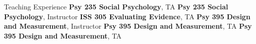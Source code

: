 \begin{rubric}{Teaching Experience}
\entry*[Fall 2019]\textbf{Psy 235 Social Psychology}, TA
\entry*[Summer 2019]\textbf{Psy 235 Social Psychology}, Instructor
\entry*[Fall 2018]\textbf{ISS 305 Evaluating Evidence}, TA
\entry*[Summer 2017] \textbf{Psy 395 Design and Measurement}, Instructor
\entry*[Spring 2017] \textbf{Psy 395 Design and Measurement}, TA
\entry*[Fall 2016] \textbf{Psy 395 Design and Measurement}, TA
\end{rubric}